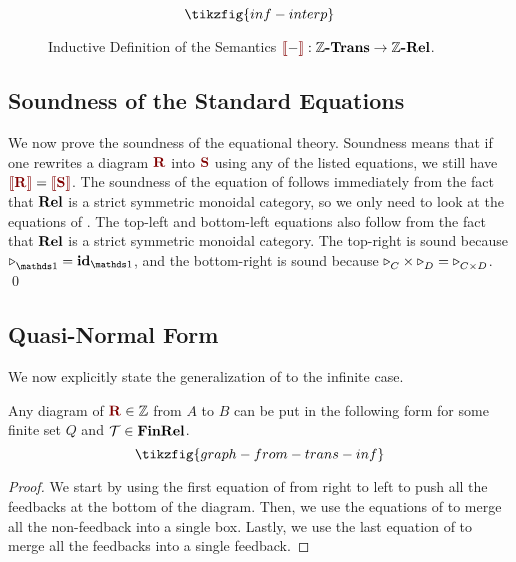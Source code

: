 \begin{figure*}
	\[\tikzfig{inf-interp}\]
	\caption{Inductive Definition of the Semantics $\rinterp{-} : \ZZ\bfup{-Trans} \to \ZZ\bfup{-Rel}$.}
	\label{appfig:inf-interp}
\end{figure*}

\subsection{Soundness of the Standard Equations}\label{app:inf-soundness}

We now prove the soundness of the equational theory. 
Soundness means that if one rewrites a diagram $\rR$ into $\rS$ using any of the listed equations, we still have $\rinterp{\rR} = \rinterp{\rS}$.  The soundness of the equation of  follows immediately from the fact that $\textbf{\textup{Rel}}$ is a strict symmetric monoidal category, so we only need to look at the equations of . The top-left and bottom-left equations also follow from the fact that $\textbf{\textup{Rel}}$ is a strict symmetric monoidal category. The top-right is sound because $\shift{}{}_\one = \id_\one$, and the bottom-right is sound because $\shift{}{}_C \times \shift{}{}_D = \shift{}{}_{C \times D}$. \qed


\subsection{Quasi-Normal Form}\label{app:inf-quasi-normal-form}

We now explicitly state the generalization of  to the infinite case.

\begin{proposition}\label{prop:normal-form-inf}
	Any diagram of $\rR \in \ZZ$ from $A$ to $B$ can be put in the following form for some finite set $Q$ and ${\mathcal{T}} \in \textbf{\textup{FinRel}}$.
	\[ \tikzfig{graph-from-trans-inf}\]
\end{proposition}
\begin{proof}
We start by using the first equation of  from right to left to push all the feedbacks at the bottom of the diagram. Then, we use the equations of  to merge all the non-feedback into a single box. Lastly, we use the last equation of  to merge all the feedbacks into a single feedback.
\end{proof}

